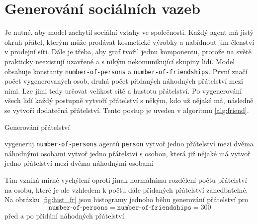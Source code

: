 \documentclass[a4wide,12pt]{report}
\begin{document}
\section{Generování sociálních vazeb}
Je nutné, aby model zachytil sociální vztahy ve společnosti. Každý agent má jistý okruh přátel, kterým může prodávat kosmetické výrobky a nabídnout jim členství v prodejní síti. Dále je třeba, aby graf tvořil jednu komponentu, protože na světě prakticky neexistují uzavřené a s nikým nekomunikující skupiny lidí. Model obsahuje konstanty \texttt{number-of-persons} a \texttt{number-of-friendships}. První značí počet vygenerovaných osob, druhá počet přidaných náhodných přátelství mezi nimi. Lze jimi tedy určovat velikost sítě a hustotu přátelství. Po vygenerování všech lidí každý postupně vytvoří přátelství s někým, kdo už nějaké má, následně se vytvoří dodatečná přátelství. Tento postup je uveden v algoritmu \ref{alg:friend}.
\begin{algorithm}
\caption{Generování přátelství}
\label{alg:friend}
\begin{algorithmic}
\STATE vygeneruj \texttt{number-of-persons} agentů \texttt{person}
\STATE vytvoř jedno přátelství mezi dvěma náhodnými osobami
  \STATE vytvoř jedno přátelství s osobou, která již nějaké má
\ENDFOR
{}
  \STATE vytvoř jedno přátelství mezi dvěma náhodnými osobami
\ENDFOR
\end{algorithmic}
\end{algorithm}
Tím vzniká mírné vychýlení oproti jinak normálnímu rozdělení počtu přátelství na osobu, které je ale vzhledem k počtu dále přidaných přátelství zanedbatelné. Na obrázku \ref{fig:hist_fr} jsou histogramy jednoho běhu generování přátelství pro \[\texttt{number-of-persons}=\texttt{number-of-friendships}=300\] před a po přidání náhodných přátelství.
\end{document}
